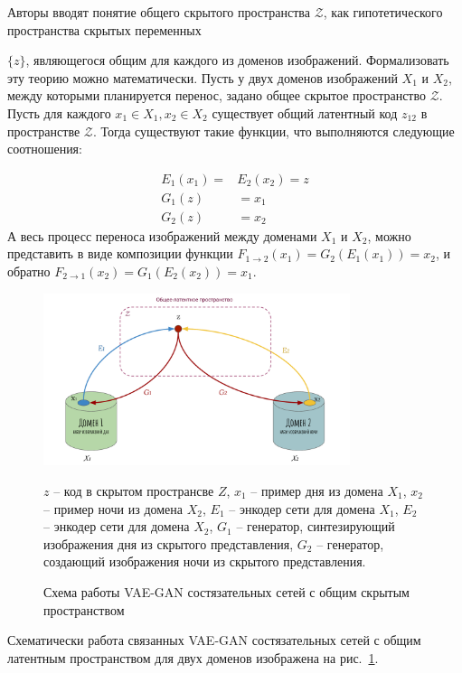 \documentclass[11pt,a4paper]{extarticle}
\begin{document}
			Авторы вводят понятие общего скрытого пространства \(\mathcal{Z}\), как гипотетического пространства скрытых переменных {\(\{z\}\), являющегося общим для каждого из доменов изображений.
			Формализовать эту теорию можно математически. Пусть у двух доменов изображений \(X_1\) и \(X_2\), между которыми планируется перенос, задано общее скрытое пространство \(\mathcal{Z}\).
			Пусть для каждого \(x_1 \in X_1, x_2 \in X_2\) существует общий латентный код \(z_{12}\) в пространстве \(\mathcal{Z}\).
			Тогда существуют такие функции, что выполняются следующие соотношения:
			
			\begin{equation}
				\begin{aligned}
					E_1(x_1) = &E_2(x_2) = z\\
					G_1(z) &= x_1\\
					G_2(z) &= x_2
				\end{aligned}
			\end{equation}
			А весь процесс переноса изображений между доменами \(X_1\) и \(X_2\), можно представить в виде композиции функции \(F_{1 \rightarrow 2}(x_1) = G_2(E_1(x_1)) = x_2\),
			и обратно \(F_{2 \rightarrow 1}(x_2) = G_1(E_2(x_2)) = x_1\). 

			\begin{figure}[ht]
				\centering
				\includegraphics[width=0.8\textwidth]{img/unit}
				\caption{Схема работы VAE-GAN состязательных сетей с общим скрытым пространством}{
					\small{
						\(z\) -- код в скрытом пространсве \(Z\), \(x_1\) -- пример дня из домена \(X_1\),
						\(x_2\) -- пример ночи из домена \(X_2\), \(E_1\) -- энкодер сети для домена \(X_1\),
						\(E_2\) -- энкодер сети для домена \(X_2\), \(G_1\) -- генератор, синтезирующий изображения дня из скрытого представления,
						\(G_2\) -- генератор, создающий изображения ночи из скрытого представления.
					}
				}
				\label{pic:unit}
			\end{figure}
			Схематически работа связанных VAE-GAN состязательных сетей с общим латентным пространством для двух доменов изображена на рис.~\ref{pic:unit}.
			
}
\end{document}
